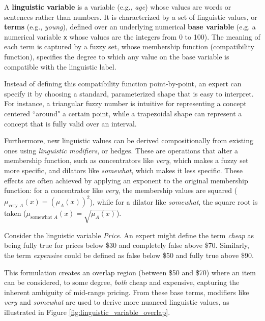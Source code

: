 \begin{definition}
A \textbf{linguistic variable} is a variable (e.g., \emph{age}) whose values are words or sentences rather than numbers. It is characterized by a set of linguistic values, or \textbf{terms} (e.g., \emph{young}), defined over an underlying numerical \textbf{base variable} (e.g. a numerical variable \texttt{x} whose values are the integers from 0 to 100). The meaning of each term is captured by a fuzzy set, whose membership function (compatibility function), specifies the degree to which any value on the base variable is compatible with the linguistic label.
\end{definition}

Instead of defining this compatibility function point-by-point, an expert can specify it by choosing a standard, parameterized shape that is easy to interpret. For instance, a triangular fuzzy number is intuitive for representing a concept centered ``around" a certain point, while a trapezoidal shape can represent a concept that is fully valid over an interval. 

Furthermore, new linguistic values can be derived compositionally from existing ones using \emph{linguistic modifiers}, or hedges. These are operations that alter a membership function, such as concentrators like \emph{very}, which makes a fuzzy set more specific, and dilators like \emph{somewhat}, which makes it less specific. These effects are often achieved by applying an exponent to the original membership function: for a concentrator like \emph{very}, the membership values are squared ($\mu_{\text{very } A}(x) = (\mu_A(x))^2$), while for a dilator like \emph{somewhat}, the square root is taken ($\mu_{\text{somewhat } A}(x) = \sqrt{\mu_A(x)}$).

\begin{example}
    Consider the linguistic variable \emph{Price}. An expert might define the term \emph{cheap} as being fully true for prices below \$30 and completely false above \$70. Similarly, the term \emph{expensive} could be defined as false below \$50 and fully true above \$90.
    
    This formulation creates an overlap region (between \$50 and \$70) where an item can be considered, to some degree, \emph{both} cheap and expensive, capturing the inherent ambiguity of mid-range pricing. From these base terms, modifiers like \emph{very} and \emph{somewhat} are used to derive more nuanced linguistic values, as illustrated in Figure \ref{fig:linguistic_variable_overlap}.
\end{example}

